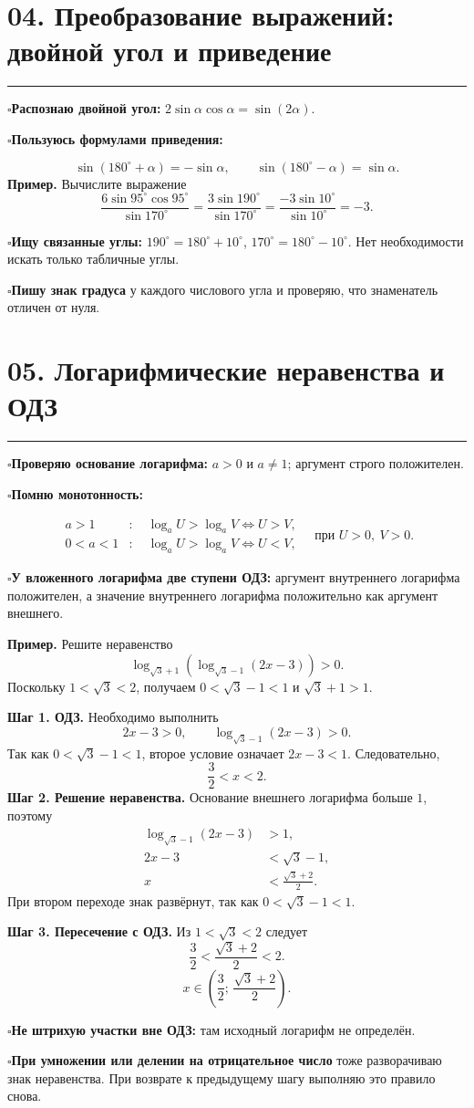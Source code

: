 \documentclass[a4paper,12pt]{article}
\newcommand{\criterion}[1]{\textcolor{darkaccent}{\bfseries #1}}
\newcommand{\checkitem}[1]{\par\noindent\textcolor{accent}{\(\square\)}\enspace #1\par}
\newcommand{\lessonsection}[1]{\Needspace{5\baselineskip}\section*{\color{darkaccent}#1}\vspace{-5pt}\noindent\textcolor{accent}{\rule{25mm}{0.7pt}}\par\vspace{1pt}}
\begin{document}
\lessonsection{04. Преобразование выражений: двойной угол и приведение}
\checkitem{\criterion{Распознаю двойной угол:} \(2\sin\alpha\cos\alpha=\sin(2\alpha)\).}
\checkitem{\criterion{Пользуюсь формулами приведения:}}
\[
\sin(180^\circ+\alpha)=-\sin\alpha,\qquad
\sin(180^\circ-\alpha)=\sin\alpha.
\]
\textbf{Пример.} Вычислите выражение
\[
\frac{6\sin95^\circ\cos95^\circ}{\sin170^\circ}
=\frac{3\sin190^\circ}{\sin170^\circ}
=\frac{-3\sin10^\circ}{\sin10^\circ}
=\boxed{-3}.
\]
\checkitem{\criterion{Ищу связанные углы:} \(190^\circ=180^\circ+10^\circ\), \(170^\circ=180^\circ-10^\circ\). Нет необходимости искать только табличные углы.}
\checkitem{\criterion{Пишу знак градуса} у каждого числового угла и проверяю, что знаменатель отличен от нуля.}

\lessonsection{05. Логарифмические неравенства и ОДЗ}
\checkitem{\criterion{Проверяю основание логарифма:} \(a>0\) и \(a\ne1\); аргумент строго положителен.}
\checkitem{\criterion{Помню монотонность:}}
\[
\begin{aligned}
 a>1 &: \quad \log_a U>\log_a V\iff U>V,\\
 0<a<1 &: \quad \log_a U>\log_a V\iff U<V,
\end{aligned}
\quad\text{при }U>0,\ V>0.
\]
\checkitem{\criterion{У вложенного логарифма две ступени ОДЗ:} аргумент внутреннего логарифма положителен, а значение внутреннего логарифма положительно как аргумент внешнего.}

\textbf{Пример.} Решите неравенство
\[
\log_{\sqrt3+1}\!\left(\log_{\sqrt3-1}(2x-3)\right)>0.
\]
Поскольку \(1<\sqrt3<2\), получаем \(0<\sqrt3-1<1\) и \(\sqrt3+1>1\).

\textbf{Шаг 1. ОДЗ.} Необходимо выполнить
\[
2x-3>0,\qquad \log_{\sqrt3-1}(2x-3)>0.
\]
Так как \(0<\sqrt3-1<1\), второе условие означает \(2x-3<1\). Следовательно,
\[
\boxed{\frac32<x<2}.
\]
\textbf{Шаг 2. Решение неравенства.} Основание внешнего логарифма больше \(1\), поэтому
\begin{align*}
\log_{\sqrt3-1}(2x-3)&>1,\\
2x-3&<\sqrt3-1,\\
x&<\frac{\sqrt3+2}{2}.
\end{align*}
При втором переходе знак развёрнут, так как \(0<\sqrt3-1<1\).

\textbf{Шаг 3. Пересечение с ОДЗ.} Из \(1<\sqrt3<2\) следует
\[
\frac32<\frac{\sqrt3+2}{2}<2.
\]
\[
\boxed{x\in\left(\frac32;\,\frac{\sqrt3+2}{2}\right)}.
\]
\checkitem{\criterion{Не штрихую участки вне ОДЗ:} там исходный логарифм не определён.}
\checkitem{\criterion{При умножении или делении на отрицательное число} тоже разворачиваю знак неравенства. При возврате к предыдущему шагу выполняю это правило снова.}
\end{document}
